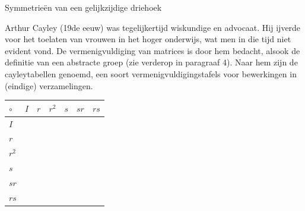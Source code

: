 \begin{lesactiviteit}{Symmetrieën van een gelijkzijdige driehoek}
	\begin{multicols}{2}
	
    	Arthur Cayley (19de eeuw) was tegelijkertijd wiskundige en advocaat. Hij ijverde voor het toelaten van vrouwen in het hoger onderwijs, wat men in die tijd niet evident vond. De vermenigvuldiging van matrices is door hem bedacht, alsook de definitie van een abstracte groep (zie verderop in paragraaf 4). Naar hem zijn de cayleytabellen genoemd, een soort vermenigvuldigingstafels voor bewerkingen in (eindige) verzamelingen. 
    	
	
	\end{multicols}
		
	\begin{vraagenantwoord}[resume]
	

		
		\begin{center}
		
        \begin{tabel}

        \setlength{\extrarowheight}{1.5pt}

		\begin{tabular}{| C{1cm} | C{1cm}| C{1cm}| C{1cm} |C{1cm}| C{1cm} |C{1cm} |} 
		\hline
		 $\circ$ & $I$ & $r$ & $r^2$ & $s$ & $sr$ & $rs$ \\
			\hline
			 $I$ &  &  & & &  & \\
			 $r$ &  &  &  &  & &\\
			 $r^2$ &  &  &  &  & &\\
			 $s$ &  &  &  &  & &\\
			 $sr$ &  &  &  &  & &\\
			 $rs$ &  &  &  &  & &\\
			\hline
		\end{tabular}		
		

\end{tabel}
\end{center}
\end{vraagenantwoord}
\end{lesactiviteit}
